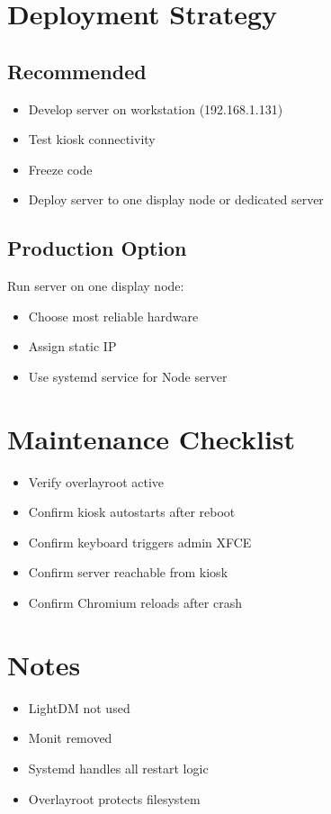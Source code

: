 \documentclass[11pt,letterpaper]{article}
\begin{document}
\section{Deployment Strategy}

\subsection{Recommended}

\begin{itemize}
\item Develop server on workstation (192.168.1.131)
\item Test kiosk connectivity
\item Freeze code
\item Deploy server to one display node or dedicated server
\end{itemize}

\subsection{Production Option}

Run server on one display node:

\begin{itemize}
\item Choose most reliable hardware
\item Assign static IP
\item Use systemd service for Node server
\end{itemize}

\section{Maintenance Checklist}

\begin{itemize}
\item Verify overlayroot active
\item Confirm kiosk autostarts after reboot
\item Confirm keyboard triggers admin XFCE
\item Confirm server reachable from kiosk
\item Confirm Chromium reloads after crash
\end{itemize}

\section{Notes}

\begin{itemize}
\item LightDM not used
\item Monit removed
\item Systemd handles all restart logic
\item Overlayroot protects filesystem
\end{itemize}
\end{document}
